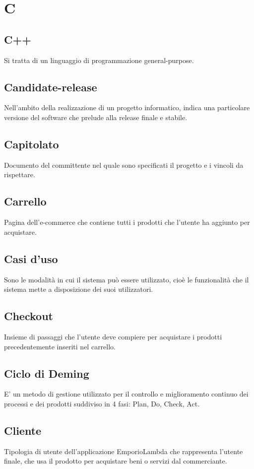 \section*{C}
\subsection*{C++}
Si tratta di un linguaggio di programmazione general-purpose.

\subsection*{Candidate-release}
Nell'ambito della realizzazione di un progetto informatico, indica una particolare versione del software che prelude alla release finale e stabile.

\subsection*{Capitolato}
Documento del committente nel quale sono specificati il progetto e i vincoli da rispettare. 
\subsection*{Carrello}
Pagina dell'e-commerce che contiene tutti i prodotti che l'utente ha aggiunto per acquistare.

\subsection*{Casi d'uso}
Sono le modalità in cui il sistema può essere utilizzato, cioè le funzionalità che il sistema mette a disposizione dei suoi utilizzatori.

\subsection*{Checkout}
Insieme di passaggi che l'utente deve compiere per acquistare i prodotti precedentemente inseriti nel carrello.

\subsection*{Ciclo di Deming}
E’ un metodo di gestione utilizzato per il controllo e miglioramento continuo dei processi e dei prodotti
suddiviso in 4 fasi: Plan, Do, Check, Act.

\subsection*{Cliente}
Tipologia di utente dell'applicazione EmporioLambda che rappresenta l'utente finale, che usa il prodotto per acquistare beni o servizi dal commerciante.

